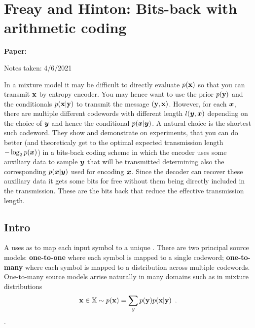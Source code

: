 \clearpage

\section{Freay and Hinton: Bits-back with arithmetic coding}\label{sec:arithmeticbitsback}

\begin{notebox}
\textbf{Paper: } 

\hfill Notes taken: 4/6/2021 
\end{notebox}

\begin{notebox}
\tldr In a mixture model it may be difficult to directly evaluate $p({\mathbf{x}})$ so that you can transmit ${\mathbf{x}}$ by entropy encoder. You may hence want to use the prior $p({\mathbf{y}})$ and the conditionals $p({\mathbf{x}} | {\mathbf{y}})$ to transmit the message $({\mathbf{y}}, {\mathbf{x}})$.
However, for each ${\bm{x}}$, there are multiple different codewords with different length $l({\bm{y}}, {\bm{x}})$ depending on the choice of ${\bm{y}}$ and hence the conditional $p({\bm{x}} | {\bm{y}})$.
A natural choice is the shortest such codeword.
They show and demonstrate on experiments, that you can do better (and theoreticaly get to the optimal expected transmission length $- \log_2 p({\bm{x}})$) in a bits-back coding scheme in which the encoder uses some auxiliary data to sample ${\bm{y}}$ that will be transmitted determining also the corresponding $p({\bm{x}} | {\bm{y}})$ used for encoding ${\bm{x}}$.
Since the decoder can recover these auxiliary data it gets some bits for free without them being directly included in the transmission. These are the bits back that reduce the effective transmission length.
\end{notebox}


\subsection{Intro}

A  uses as  to map each input symbol to a unique .
There are two principal source models:
\textbf{one-to-one} where each symbol is mapped to a single codeword;
\textbf{one-to-many} where each symbol is mapped to a distribution across multiple codewords.
One-to-many source models arrise naturally in many domains such as in mixture distributions
\begin{align}
{\mathbf{x}} \in {\mathbb{X}} \sim p({\mathbf{x}}) = \sum_y p({\mathbf{y}}) p({\mathbf{x}} \vert {\mathbf{y}}) \enspace .
\end{align}.

